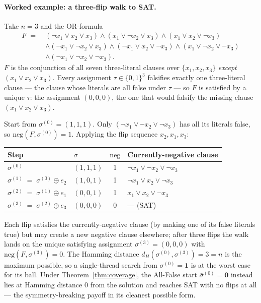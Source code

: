 \documentclass[11pt]{article}
\begin{document}
\paragraph{Worked example: a three-flip walk to SAT.}
Take $n = 3$ and the OR-formula
\begin{align*}
F \;=\; & (\neg x_1 \vee x_2 \vee x_3)
   \wedge (x_1 \vee \neg x_2 \vee x_3)
   \wedge (x_1 \vee x_2 \vee \neg x_3) \\
   & \wedge (\neg x_1 \vee \neg x_2 \vee x_3)
   \wedge (\neg x_1 \vee x_2 \vee \neg x_3)
   \wedge (x_1 \vee \neg x_2 \vee \neg x_3) \\
   & \wedge (\neg x_1 \vee \neg x_2 \vee \neg x_3).
\end{align*}
$F$ is the conjunction of all seven three-literal clauses over
$\{x_1, x_2, x_3\}$ \emph{except} $(x_1 \vee x_2 \vee x_3)$. Every
assignment $\tau \in \{0,1\}^3$ falsifies exactly one three-literal
clause — the clause whose literals are all false under $\tau$ — so $F$
is satisfied by a unique $\tau$: the assignment $(0,0,0)$, the one that
would falsify the missing clause $(x_1 \vee x_2 \vee x_3)$.

Start from $\sigma^{(0)} = (1,1,1)$. Only $(\neg x_1 \vee \neg x_2 \vee
\neg x_3)$ has all its literals false, so $\mathrm{neg}(F,
\sigma^{(0)}) = 1$. Applying the flip sequence $x_2, x_1, x_3$:

\begin{center}
\begin{tabular}{llcl}
\toprule
Step & $\sigma$ & $\mathrm{neg}$ & Currently-negative clause \\
\midrule
$\sigma^{(0)}$ & $(1,1,1)$ & 1 & $\neg x_1 \vee \neg x_2 \vee \neg x_3$ \\
$\sigma^{(1)} \;=\; \sigma^{(0)} \oplus e_2$ & $(1,0,1)$ & 1 & $\neg x_1 \vee x_2 \vee \neg x_3$ \\
$\sigma^{(2)} \;=\; \sigma^{(1)} \oplus e_1$ & $(0,0,1)$ & 1 & $x_1 \vee x_2 \vee \neg x_3$ \\
$\sigma^{(3)} \;=\; \sigma^{(2)} \oplus e_3$ & $(0,0,0)$ & 0 & --- (SAT) \\
\bottomrule
\end{tabular}
\end{center}

Each flip satisfies the currently-negative clause (by making one of
its false literals true) but may create a new negative clause
elsewhere; after three flips the walk lands on the unique satisfying
assignment $\sigma^{(3)} = (0,0,0)$ with $\mathrm{neg}(F,
\sigma^{(3)}) = 0$. The Hamming distance
$d_H(\sigma^{(0)}, \sigma^{(3)}) = 3 = n$ is the maximum possible, so
a single-thread search from $\sigma^{(0)} = \mathbf{1}$ is at the
worst case for its ball. Under
Theorem~\ref{thm:coverage}, the All-False start $\bar\sigma^{(0)} =
\mathbf{0}$ instead lies at Hamming distance $0$ from the solution
and reaches SAT with no flips at all — the symmetry-breaking payoff
in its cleanest possible form.
\end{document}
